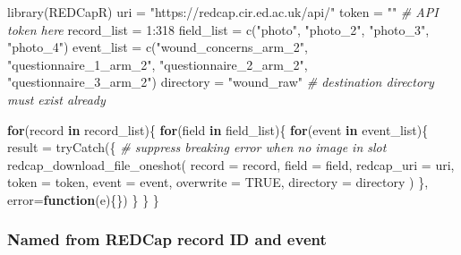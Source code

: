 \documentclass[
]{book}
\newenvironment{Shaded}{\begin{snugshade}}{\end{snugshade}}
\newcommand{\AttributeTok}[1]{\textcolor[rgb]{0.77,0.63,0.00}{#1}}
\newcommand{\CommentTok}[1]{\textcolor[rgb]{0.56,0.35,0.01}{\textit{#1}}}
\newcommand{\ConstantTok}[1]{\textcolor[rgb]{0.00,0.00,0.00}{#1}}
\newcommand{\ControlFlowTok}[1]{\textcolor[rgb]{0.13,0.29,0.53}{\textbf{#1}}}
\newcommand{\DecValTok}[1]{\textcolor[rgb]{0.00,0.00,0.81}{#1}}
\newcommand{\FunctionTok}[1]{\textcolor[rgb]{0.00,0.00,0.00}{#1}}
\newcommand{\NormalTok}[1]{#1}
\newcommand{\OtherTok}[1]{\textcolor[rgb]{0.56,0.35,0.01}{#1}}
\newcommand{\SpecialCharTok}[1]{\textcolor[rgb]{0.00,0.00,0.00}{#1}}
\newcommand{\StringTok}[1]{\textcolor[rgb]{0.31,0.60,0.02}{#1}}
\begin{document}
\begin{Shaded}
\begin{Highlighting}[]
\FunctionTok{library}\NormalTok{(REDCapR)}
\NormalTok{uri }\OtherTok{=} \StringTok{"https://redcap.cir.ed.ac.uk/api/"}
\NormalTok{token }\OtherTok{=} \StringTok{""} \CommentTok{\# API token here}
\NormalTok{record\_list }\OtherTok{=} \DecValTok{1}\SpecialCharTok{:}\DecValTok{318}
\NormalTok{field\_list }\OtherTok{=} \FunctionTok{c}\NormalTok{(}\StringTok{"photo"}\NormalTok{, }\StringTok{"photo\_2"}\NormalTok{, }\StringTok{"photo\_3"}\NormalTok{, }\StringTok{"photo\_4"}\NormalTok{)}
\NormalTok{event\_list }\OtherTok{=} \FunctionTok{c}\NormalTok{(}\StringTok{"wound\_concerns\_arm\_2"}\NormalTok{, }\StringTok{"questionnaire\_1\_arm\_2"}\NormalTok{,}
               \StringTok{"questionnaire\_2\_arm\_2"}\NormalTok{, }\StringTok{"questionnaire\_3\_arm\_2"}\NormalTok{)}
\NormalTok{directory }\OtherTok{=} \StringTok{"wound\_raw"} \CommentTok{\# destination directory must exist already}


\ControlFlowTok{for}\NormalTok{(record }\ControlFlowTok{in}\NormalTok{ record\_list)\{}
  \ControlFlowTok{for}\NormalTok{(field }\ControlFlowTok{in}\NormalTok{ field\_list)\{}
    \ControlFlowTok{for}\NormalTok{(event }\ControlFlowTok{in}\NormalTok{ event\_list)\{}
\NormalTok{      result }\OtherTok{=} 
        \FunctionTok{tryCatch}\NormalTok{(\{      }\CommentTok{\# suppress breaking error when no image in slot}
          \FunctionTok{redcap\_download\_file\_oneshot}\NormalTok{(}
            \AttributeTok{record        =}\NormalTok{ record,}
            \AttributeTok{field         =}\NormalTok{ field,}
            \AttributeTok{redcap\_uri    =}\NormalTok{ uri,}
            \AttributeTok{token         =}\NormalTok{ token,}
            \AttributeTok{event         =}\NormalTok{ event,}
            \AttributeTok{overwrite     =} \ConstantTok{TRUE}\NormalTok{,}
            \AttributeTok{directory     =}\NormalTok{ directory}
\NormalTok{          )}
\NormalTok{        \}, }\AttributeTok{error=}\ControlFlowTok{function}\NormalTok{(e)\{\})}
\NormalTok{    \}}
\NormalTok{  \}}
\NormalTok{\}}
\end{Highlighting}
\end{Shaded}

\hypertarget{named-from-redcap-record-id-and-event}{%
\subsubsection{Named from REDCap record ID and event}\label{named-from-redcap-record-id-and-event}}
\end{document}

